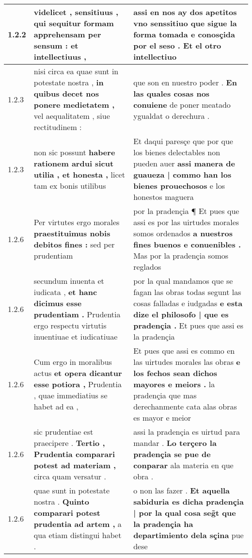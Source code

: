 \begin{tabular}{|p{1cm}|p{6.5cm}|p{6.5cm}|}
1.2.2 & videlicet , sensitiuus , \textbf{ qui sequitur formam apprehensam per sensum : } et intellectiuus , & assi en nos ay dos apetitos vno \textbf{ senssitiuo que sigue la forma tomada e conosçida por el seso . } Et el otro intellectiuo \\\hline
1.2.3 & nisi circa ea quae sunt in potestate nostra , \textbf{ in quibus decet nos ponere medietatem , } vel aequalitatem , siue rectitudinem : & que son en nuestro poder . \textbf{ En las quales cosas nos conuiene } de poner meatado ygualdat o derechura . \\\hline
1.2.3 & non sic possunt \textbf{ habere rationem ardui sicut utilia , et honesta , } licet tam ex bonis utilibus & Et daqui paresçe que por que los bienes delectables non pueden auer \textbf{ assi manera de guaueza | commo han los bienes prouechosos } e los honestos maguera \\\hline
1.2.6 & Per virtutes ergo morales \textbf{ praestituimus nobis debitos fines : } sed per prudentiam & por la pradençia ¶ Et pues que assi es por las uirtudes morales somos ordenados \textbf{ a nuestros fines buenos e conuenibles . } Mas por la pradençia somos reglados \\\hline
1.2.6 & secundum inuenta et iudicata , \textbf{ et hanc dicimus esse prudentiam . } Prudentia ergo respectu virtutis inuentiuae et iudicatiuae & por la qual mandamos que se fagan las obras todas segunt las cosas falladas e iudgadas \textbf{ e esta dize el philosofo | que es pradençia . } Et pues que assi es la pradençia \\\hline
1.2.6 & Cum ergo in moralibus actus \textbf{ et opera dicantur esse potiora , } Prudentia , quae immediatius se habet ad ea , & Et pues que assi es commo en las uirtudes morales las obras \textbf{ e los fechos sean dichos mayores e meiors . } la pradençia que mas derechanmente cata alas obras es mayor e meior \\\hline
1.2.6 & sic prudentiae est praecipere . \textbf{ Tertio , Prudentia comparari potest ad materiam , } circa quam versatur . & assi la pradençia es uirtud para mandar . \textbf{ Lo terçero la pradençia se pue de conparar } ala materia en que obra . \\\hline
1.2.6 & quae sunt in potestate nostra . \textbf{ Quinto comparari potest prudentia ad artem , } a qua etiam distingui habet . & o non las fazer . \textbf{ Et aquella sabiduria es dicha pradençia | por la qual cosa seg̃t que la pradençia ha departimiento dela sçina } pue dese \\\hline

\end{tabular}

